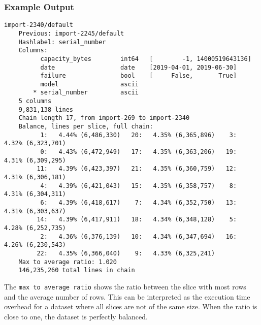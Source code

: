 \subsubsection*{Example Output}
\begin{snugshade}
\begin{verbatim}
import-2340/default
    Previous: import-2245/default
    Hashlabel: serial_number
    Columns:
          capacity_bytes        int64   [        -1, 14000519643136]
          date                  date    [2019-04-01, 2019-06-30]
          failure               bool    [     False,       True]
          model                 ascii
        * serial_number         ascii
    5 columns
    9,831,138 lines
    Chain length 17, from import-269 to import-2340
    Balance, lines per slice, full chain:
          1:   4.44% (6,486,330)   20:   4.35% (6,365,896)    3:   4.32% (6,323,701)
          0:   4.43% (6,472,949)   17:   4.35% (6,363,206)   19:   4.31% (6,309,295)
         11:   4.39% (6,423,397)   21:   4.35% (6,360,759)   12:   4.31% (6,306,181)
          4:   4.39% (6,421,043)   15:   4.35% (6,358,757)    8:   4.31% (6,304,311)
          6:   4.39% (6,418,617)    7:   4.34% (6,352,750)   13:   4.31% (6,303,637)
         14:   4.39% (6,417,911)   18:   4.34% (6,348,128)    5:   4.28% (6,252,735)
          2:   4.36% (6,376,139)   10:   4.34% (6,347,694)   16:   4.26% (6,230,543)
         22:   4.35% (6,366,040)    9:   4.33% (6,325,241)
    Max to average ratio: 1.020
    146,235,260 total lines in chain
\end{verbatim}
\end{snugshade}
The \texttt{max to average ratio} shows the ratio between the slice
with most rows and the average number of rows.  This can be
interpreted as the execution time overhead for a dataset where all
slices are not of the same size.  When the ratio is close to one, the
dataset is perfectly balanced.


